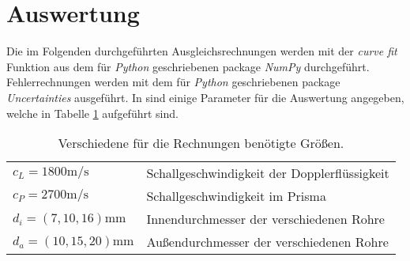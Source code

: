 \section{Auswertung}
\label{sec:Auswertung}
Die im Folgenden durchgeführten Ausgleichsrechnungen werden mit der \emph{curve fit} Funktion aus dem für \emph{Python} geschriebenen package \emph{NumPy}\cite{scipy} durchgeführt. Fehlerrechnungen werden mit dem für \emph{Python} geschriebenen package \emph{Uncertainties}\cite{uncertainties} ausgeführt.
In \cite{skript} sind einige Parameter für die Auswertung angegeben, welche in Tabelle \ref{tab:parameter} aufgeführt sind.
\begin{table}
  \centering
  \caption{Verschiedene für die Rechnungen benötigte Größen.}
  \label{tab:parameter}
  \begin{tabular}{p{} p{}}
    \toprule
    $c_L = 1800\si{\meter\per\second}$  & Schallgeschwindigkeit der Dopplerflüssigkeit  \\
    $c_P = 2700\si{\meter\per\second}$  & Schallgeschwindigkeit im Prisma \\
    $d_i = (7,10,16)\si{\milli\meter}$  & Innendurchmesser der verschiedenen Rohre \\
    $d_a = (10,15,20)\si{\milli\meter}$ & Außendurchmesser der verschiedenen Rohre \\
    \bottomrule
  \end{tabular}
\end{table}

